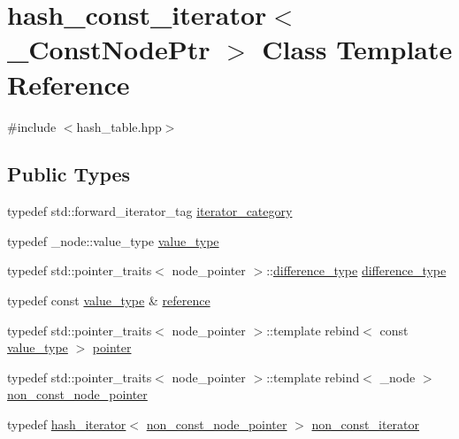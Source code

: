 \hypertarget{classhash__const__iterator}{}\section{hash\+\_\+const\+\_\+iterator$<$ \+\_\+\+Const\+Node\+Ptr $>$ Class Template Reference}
\label{classhash__const__iterator}


{\ttfamily \#include $<$hash\+\_\+table.\+hpp$>$}

\subsection*{Public Types}
\begin{DoxyCompactItemize}
\item 
typedef std\+::forward\+\_\+iterator\+\_\+tag \hyperlink{classhash__const__iterator_aa4c49734f4b5370ed6e8bc14be74c79d}{iterator\+\_\+category}
\item 
typedef \+\_\+node\+::value\+\_\+type \hyperlink{classhash__const__iterator_a116458588698b7c3ab105dd581c8d666}{value\+\_\+type}
\item 
typedef std\+::pointer\+\_\+traits$<$ node\+\_\+pointer $>$\+::\hyperlink{classhash__const__iterator_a59ea10fb6033eb3ec9ac819e781d8f3a}{difference\+\_\+type} \hyperlink{classhash__const__iterator_a59ea10fb6033eb3ec9ac819e781d8f3a}{difference\+\_\+type}
\item 
typedef const \hyperlink{classhash__const__iterator_a116458588698b7c3ab105dd581c8d666}{value\+\_\+type} \& \hyperlink{classhash__const__iterator_a9634442043c96c628889101cc7e5639d}{reference}
\item 
typedef std\+::pointer\+\_\+traits$<$ node\+\_\+pointer $>$\+::template rebind$<$ const \hyperlink{classhash__const__iterator_a116458588698b7c3ab105dd581c8d666}{value\+\_\+type} $>$ \hyperlink{classhash__const__iterator_a3a6d2d49ab869df674b9b0e828117fe4}{pointer}
\item 
typedef std\+::pointer\+\_\+traits$<$ node\+\_\+pointer $>$\+::template rebind$<$ \+\_\+node $>$ \hyperlink{classhash__const__iterator_a0c858fd44628d6f0ddf88c629e4bea7f}{non\+\_\+const\+\_\+node\+\_\+pointer}
\item 
typedef \hyperlink{classhash__iterator}{hash\+\_\+iterator}$<$ \hyperlink{classhash__const__iterator_a0c858fd44628d6f0ddf88c629e4bea7f}{non\+\_\+const\+\_\+node\+\_\+pointer} $>$ \hyperlink{classhash__const__iterator_ab4441e734185e334b2b02f49f83af048}{non\+\_\+const\+\_\+iterator}
\end{DoxyCompactItemize}
